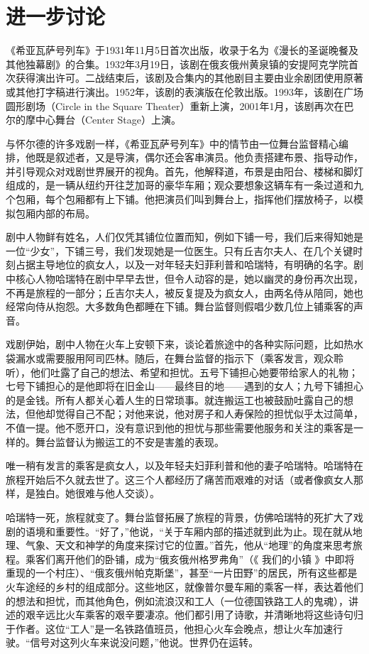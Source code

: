 \documentclass[lang=cn,newtx,10pt,scheme=chinese]{elegantbook}
\begin{document}
\section{进一步讨论}

《希亚瓦萨号列车》于1931年11月5日首次出版，收录于名为《漫长的圣诞晚餐及其他独幕剧》的合集。1932年3月19日，该剧在俄亥俄州黄泉镇的安提阿克学院首次获得演出许可。二战结束后，该剧及合集内的其他剧目主要由业余剧团使用原著或其他打字稿进行演出。1952年，该剧的表演版在伦敦出版。1993年，该剧在广场圆形剧场（Circle in the Square Theater）重新上演，2001年1月，该剧再次在巴尔的摩中心舞台（Center Stage）上演。

与怀尔德的许多戏剧一样，《希亚瓦萨号列车》中的情节由一位舞台监督精心编排，他既是叙述者，又是导演，偶尔还会客串演员。他负责搭建布景、指导动作，并引导观众对戏剧世界展开的视角。首先，他解释道，布景是由阳台、楼梯和脚灯组成的，是一辆从纽约开往芝加哥的豪华车厢；观众要想象这辆车有一条过道和九个包厢，每个包厢都有上下铺。他把演员们叫到舞台上，指挥他们摆放椅子，以模拟包厢内部的布局。

剧中人物鲜有姓名，人们仅凭其铺位位置而知，例如下铺一号，我们后来得知她是一位“少女”，下铺三号，我们发现她是一位医生。只有丘吉尔夫人、在几个关键时刻占据主导地位的疯女人，以及一对年轻夫妇菲利普和哈瑞特，有明确的名字。剧中核心人物哈瑞特在剧中早早去世，但令人动容的是，她以幽灵的身份再次出现，不再是旅程的一部分；丘吉尔夫人，被反复提及为疯女人，由两名侍从陪同，她也经常向侍从抱怨。大多数角色都睡在下铺。舞台监督则假唱少数几位上铺乘客的声音。

戏剧伊始，剧中人物在火车上安顿下来，谈论着旅途中的各种实际问题，比如热水袋漏水或需要服用阿司匹林。随后，在舞台监督的指示下（乘客发言，观众聆听），他们吐露了自己的想法、希望和担忧。五号下铺担心她要带给家人的礼物；七号下铺担心的是他即将在旧金山——最终目的地——遇到的女人；九号下铺担心的是金钱。所有人都关心着人生的日常琐事。就连搬运工也被鼓励吐露自己的想法，但他却觉得自己不配；对他来说，他对房子和人寿保险的担忧似乎太过简单，不值一提。他不愿开口，没有意识到他的担忧与那些需要他服务和关注的乘客是一样的。舞台监督认为搬运工的不安是害羞的表现。

唯一稍有发言的乘客是疯女人，以及年轻夫妇菲利普和他的妻子哈瑞特。哈瑞特在旅程开始后不久就去世了。这三个人都经历了痛苦而艰难的对话（或者像疯女人那样，是独白。她很难与他人交谈）。

哈瑞特一死，旅程就变了。舞台监督拓展了旅程的背景，仿佛哈瑞特的死扩大了戏剧的语境和重要性。“好了，”他说，“关于车厢内部的描述就到此为止。现在就从地理、气象、天文和神学的角度来探讨它的位置。”首先，他从“地理”的角度来思考旅程。乘客们离开他们的卧铺，成为“俄亥俄州格罗弗角”（《 我们的小镇 》中即将重现的一个村庄）、“俄亥俄州帕克斯堡”，甚至“一片田野”的居民，所有这些都是火车途经的乡村的组成部分。这些地区，就像普尔曼车厢的乘客一样，表达着他们的想法和担忧，而其他角色，例如流浪汉和工人（一位德国铁路工人的鬼魂），讲述的艰辛远比火车乘客的艰辛要凄凉。他们都引用了诗歌，并清晰地将这些诗句归于作者。这位“工人”是一名铁路值班员，他担心火车会晚点，想让火车加速行驶。“信号对这列火车来说没问题，”他说。世界仍在运转。
\end{document}
